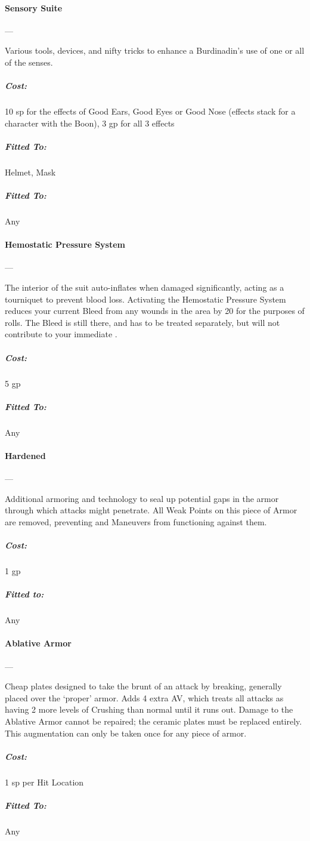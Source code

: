 \documentclass[oneside,11pt,english]{book}
\begin{document}
\paragraph{Sensory Suite}---

Various tools, devices, and nifty tricks to enhance a Burdinadin’s use of one or all of the senses. 
\vspace{-15pt}\subparagraph{Cost:} 10 sp for the effects of Good Ears, Good Eyes or Good Nose (effects stack for a character with the Boon), 3 gp for all 3 effects
\vspace{-15pt}\subparagraph{Fitted To:} Helmet, Mask
\vspace{-15pt}\subparagraph{Fitted To:} Any

\paragraph{Hemostatic Pressure System}---\quad[1]

The interior of the suit auto-inflates when damaged significantly, acting as a tourniquet to prevent blood 
loss. Activating the Hemostatic Pressure System reduces your current Bleed from any wounds in the area 
by 20 for the purposes of  rolls. The Bleed is still there, and has to be treated separately, but
will not contribute to your immediate .
\subparagraph{Cost:} 5 gp
\vspace{-15pt}\subparagraph{Fitted To:} Any

\paragraph{Hardened}---\quad[1]

Additional armoring and technology to seal up potential gaps in the armor
through which attacks might penetrate. All Weak Points on this piece of Armor
are removed, preventing  and
 Maneuvers from functioning against them.
\vspace{-15pt}\subparagraph{Cost:} 1 gp
\vspace{-15pt}\subparagraph{Fitted to:} Any

\paragraph{Ablative Armor}---\quad[1]

Cheap plates designed to take the brunt of an attack by breaking, generally
placed over the ‘proper’ armor. Adds 4 extra AV, which treats all attacks as
having 2 more levels of Crushing than normal until it runs out. Damage to the
Ablative Armor cannot be repaired; the ceramic plates must be replaced entirely.
This augmentation can only be taken once for any piece of armor.  
\vspace{-15pt}\subparagraph{Cost:} 1 sp per Hit Location
\vspace{-15pt}\subparagraph{Fitted To:} Any
\end{document}
